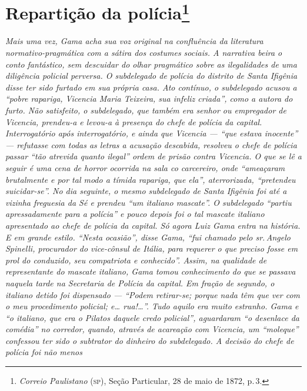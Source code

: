 \chapter{Repartição da polícia\footnote{\emph{Correio Paulistano} (\textsc{sp}), Seção Particular,
  28 de maio de 1872, p.\,3.}} %

\begin{didascalia}
\emph{Mais uma vez, Gama acha sua voz original na confluência da
literatura normativo-pragmática com a sátira dos costumes sociais. A
narrativa beira o conto fantástico, sem descuidar do olhar pragmático
sobre as ilegalidades de uma diligência policial perversa. O subdelegado
de polícia do distrito de Santa Ifigênia disse ter sido furtado em sua
própria casa. Ato contínuo, o subdelegado acusou a ``pobre rapariga,
Vicencia Maria Teixeira, sua infeliz criada'', como a autora do furto.
Não satisfeito, o subdelegado, que também era senhor ou empregador de
Vicencia, prendeu-a e levou-a à presença do chefe de polícia da capital.
Interrogatório após interrogatório, e ainda que Vicencia --- ``que estava
inocente'' --- refutasse com todas as letras a acusação descabida,
resolveu o chefe de polícia passar ``tão atrevida quanto ilegal'' ordem de
prisão contra Vicencia. O que se lê a seguir é uma cena de horror
ocorrida na sala co carcereiro, onde ``ameaçaram brutalmente e por tal
modo a tímida rapariga, que ela'', aterrorizada, ``pretendeu suicidar-se''.
No dia seguinte, o mesmo subdelegado de Santa Ifigênia foi até a vizinha
freguesia da Sé e prendeu ``um italiano mascate''. O subdelegado ``partiu
apressadamente para a polícia'' e pouco depois foi o tal mascate italiano
apresentado ao chefe de polícia da capital. Só agora Luiz Gama entra na
história. E em grande estilo. ``Nesta ocasião'', disse Gama, ``fui chamado
pelo sr.\,Angelo Spinelli, procurador do vice-cônsul de Itália, para
requerer o que preciso fosse em prol do conduzido, seu compatriota e
conhecido''. Assim, na qualidade de representante do mascate italiano,
Gama tomou conhecimento do que se passava naquela tarde na Secretaria de
Polícia da capital. Em fração de segundo, o italiano detido foi
dispensado --- ``Podem retirar-se; porque nada têm que ver com o meu
procedimento policial; e\ldots{} rua!\ldots{}''. Tudo aquilo era muito estranho.
Gama e ``o italiano, que era o Pilatos daquele credo policial'',
aguardaram ``o desenlace da comédia'' no corredor, quando, através de
acareação com Vicencia, um ``moleque'' confessou ter sido o subtrator do
dinheiro do subdelegado. A decisão do chefe de polícia foi não menos
}
\end{didascalia}
